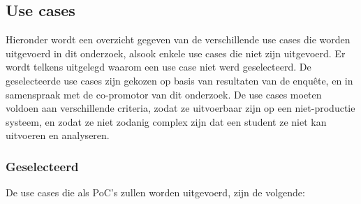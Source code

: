 \subsection{Use cases}
Hieronder wordt een overzicht gegeven van de verschillende use cases die worden uitgevoerd in dit onderzoek, alsook enkele use cases die niet zijn uitgevoerd. Er wordt telkens uitgelegd waarom een use case niet werd geselecteerd. De geselecteerde use cases zijn gekozen op basis van resultaten van de enquête, en in samenspraak met de co-promotor van dit onderzoek. De use cases moeten voldoen aan verschillende criteria, zodat ze uitvoerbaar zijn op een niet-productie systeem, en zodat ze niet zodanig complex zijn dat een student ze niet kan uitvoeren en analyseren.
\subsubsection{Geselecteerd}
De use cases die als PoC's zullen worden uitgevoerd, zijn de volgende:
